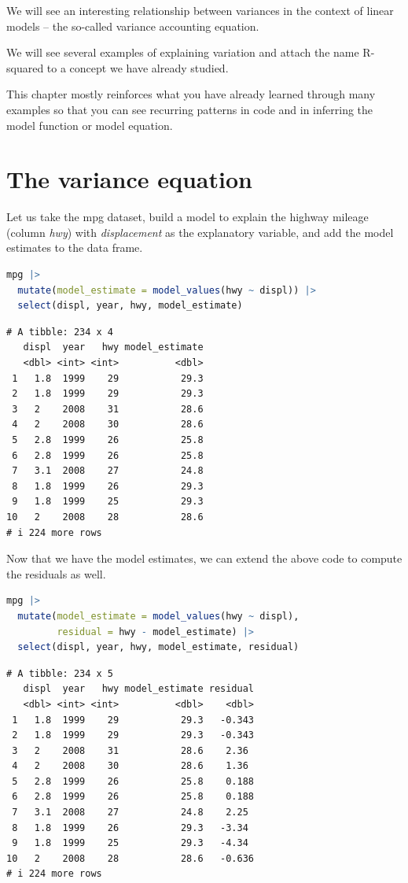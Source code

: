 \documentclass[
  12pt,
  letterpaper,
  DIV=11,
  numbers=noendperiod]{scrreprt}
\begin{document}
We will see an interesting relationship between variances in the context
of linear models -- the so-called variance accounting equation.

We will see several examples of explaining variation and attach the name
R-squared to a concept we have already studied.

This chapter mostly reinforces what you have already learned through
many examples so that you can see recurring patterns in code and in
inferring the model function or model equation.

\section{The variance equation}\label{the-variance-equation}

Let us take the mpg dataset, build a model to explain the highway
mileage (column \emph{hwy}) with \emph{displacement} as the explanatory
variable, and add the model estimates to the data frame.

\begin{lstlisting}[language=R]
mpg |> 
  mutate(model_estimate = model_values(hwy ~ displ)) |> 
  select(displ, year, hwy, model_estimate)
\end{lstlisting}

\begin{lstlisting}
# A tibble: 234 x 4
   displ  year   hwy model_estimate
   <dbl> <int> <int>          <dbl>
 1   1.8  1999    29           29.3
 2   1.8  1999    29           29.3
 3   2    2008    31           28.6
 4   2    2008    30           28.6
 5   2.8  1999    26           25.8
 6   2.8  1999    26           25.8
 7   3.1  2008    27           24.8
 8   1.8  1999    26           29.3
 9   1.8  1999    25           29.3
10   2    2008    28           28.6
# i 224 more rows
\end{lstlisting}

Now that we have the model estimates, we can extend the above code to
compute the residuals as well.

\begin{lstlisting}[language=R]
mpg |> 
  mutate(model_estimate = model_values(hwy ~ displ),
         residual = hwy - model_estimate) |> 
  select(displ, year, hwy, model_estimate, residual)
\end{lstlisting}

\begin{lstlisting}
# A tibble: 234 x 5
   displ  year   hwy model_estimate residual
   <dbl> <int> <int>          <dbl>    <dbl>
 1   1.8  1999    29           29.3   -0.343
 2   1.8  1999    29           29.3   -0.343
 3   2    2008    31           28.6    2.36 
 4   2    2008    30           28.6    1.36 
 5   2.8  1999    26           25.8    0.188
 6   2.8  1999    26           25.8    0.188
 7   3.1  2008    27           24.8    2.25 
 8   1.8  1999    26           29.3   -3.34 
 9   1.8  1999    25           29.3   -4.34 
10   2    2008    28           28.6   -0.636
# i 224 more rows
\end{lstlisting}
\end{document}

